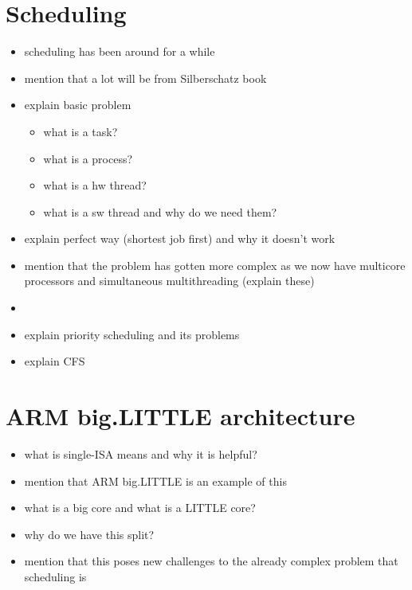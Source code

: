 \section{Scheduling}
\begin{itemize}
    \item scheduling has been around for a while
    \item mention that a lot will be from Silberschatz book
    \item explain basic problem
    \begin{itemize}
        \item what is a task?
        \item what is a process?
        \item what is a hw thread?
        \item what is a sw thread and why do we need them?
    \end{itemize}
    \item explain perfect way (shortest job first) and why it doesn't work
    \item mention that the problem has gotten more complex as we now have
          multicore processors and simultaneous multithreading (explain these)
    \item 
    \item explain priority scheduling and its problems
    \item explain CFS
\end{itemize}

\section{ARM big.LITTLE architecture}
\begin{itemize}
    \item what is single-ISA means and why it is helpful?
    \item mention that ARM big.LITTLE is an example of this
    \item what is a big core and what is a LITTLE core?
    \item why do we have this split?
    \item mention that this poses new challenges to the already complex problem
          that scheduling is
\end{itemize}
